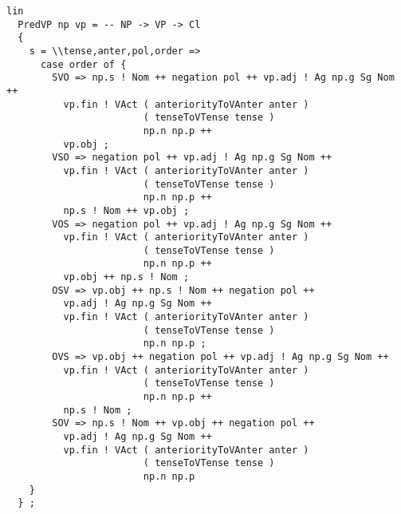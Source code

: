 \begin{lstlisting}[float=h!tp,caption={\texttt{PredVP}-Regel zur Kombination einer \texttt{NP} und einer \texttt{VP} zu einer \texttt{Cl}},basicstyle=\small,label={GF-Sentence-PredVP}]
lin
  PredVP np vp = -- NP -> VP -> Cl
  {
    s = \\tense,anter,pol,order => 
      case order of {
        SVO => np.s ! Nom ++ negation pol ++ vp.adj ! Ag np.g Sg Nom ++ 
          vp.fin ! VAct ( anteriorityToVAnter anter ) 
                        ( tenseToVTense tense ) 
                        np.n np.p ++
          vp.obj ;
        VSO => negation pol ++ vp.adj ! Ag np.g Sg Nom ++ 
          vp.fin ! VAct ( anteriorityToVAnter anter ) 
                        ( tenseToVTense tense ) 
                        np.n np.p ++ 
          np.s ! Nom ++ vp.obj ;
        VOS => negation pol ++ vp.adj ! Ag np.g Sg Nom ++ 
          vp.fin ! VAct ( anteriorityToVAnter anter ) 
                        ( tenseToVTense tense ) 
                        np.n np.p ++ 
          vp.obj ++ np.s ! Nom ;
        OSV => vp.obj ++ np.s ! Nom ++ negation pol ++ 
          vp.adj ! Ag np.g Sg Nom ++ 
          vp.fin ! VAct ( anteriorityToVAnter anter ) 
                        ( tenseToVTense tense ) 
                        np.n np.p ;
        OVS => vp.obj ++ negation pol ++ vp.adj ! Ag np.g Sg Nom ++
          vp.fin ! VAct ( anteriorityToVAnter anter ) 
                        ( tenseToVTense tense ) 
                        np.n np.p ++ 
          np.s ! Nom ;
        SOV => np.s ! Nom ++ vp.obj ++ negation pol ++ 
          vp.adj ! Ag np.g Sg Nom ++ 
          vp.fin ! VAct ( anteriorityToVAnter anter ) 
                        ( tenseToVTense tense ) 
                        np.n np.p 
    }
  } ;
\end{lstlisting}
